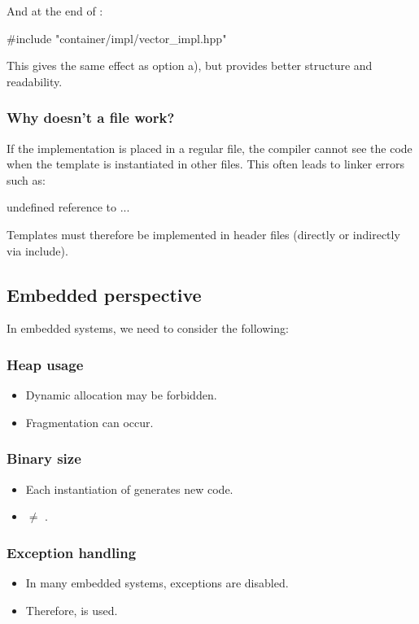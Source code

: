 \noindent And at the end of :

\begin{cppcode}
#include "container/impl/vector_impl.hpp"
\end{cppcode}

\noindent This gives the same effect as option a), but provides better structure and readability.

\subsubsection{Why doesn't a  file work?}
If the implementation is placed in a regular  file, the compiler cannot see the code
when the template is instantiated in other files. This often leads to linker errors such as:

\begin{console}
undefined reference to ...
\end{console}

\noindent Templates must therefore be implemented in header files (directly or indirectly via
include).

\subsection{Embedded perspective}
\label{c5:sec:embedded}
In embedded systems, we need to consider the following:

\subsubsection{Heap usage}
\begin{itemize}
  \item Dynamic allocation may be forbidden.
  \item Fragmentation can occur.
\end{itemize}

\subsubsection{Binary size}
\begin{itemize}
  \item Each instantiation of  generates new code.
  \item {} $\neq$ .
\end{itemize}

\subsubsection{Exception handling}
\begin{itemize}
  \item In many embedded systems, exceptions are disabled.
  \item Therefore,  is used.
\end{itemize}

